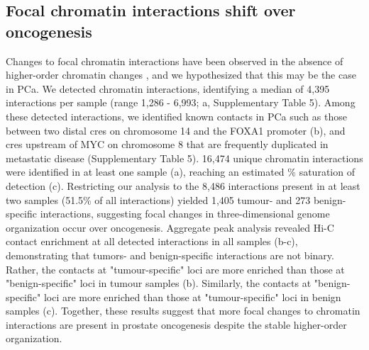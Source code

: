 \subsection{Focal chromatin interactions shift over oncogenesis}

Changes to focal chromatin interactions have been observed in the absence of higher-order chromatin changes \cite{takayamaTransitionQuiescentActivated2021,johnstoneLargeScaleTopologicalChanges2020}, and we hypothesized that this may be the case in PCa.
We detected chromatin interactions, identifying a median of 4,395 interactions per sample (range 1,286 - 6,993; a, Supplementary Table 5).
Among these detected interactions, we identified known contacts in PCa such as those between two distal \glspl{cre} on chromosome 14 and the FOXA1 promoter \cite{zhouNoncodingMutationsTarget2020} (b), and \glspl{cre} upstream of MYC on chromosome 8 that are frequently duplicated in metastatic disease \cite{quigleyGenomicHallmarksStructural2018} (Supplementary Table 5).
16,474 unique chromatin interactions were identified in at least one sample (a), reaching an estimated \% saturation of detection (c).
Restricting our analysis to the 8,486 interactions present in at least two samples (51.5\% of all interactions) yielded 1,405 tumour- and 273 benign-specific interactions, suggesting focal changes in three-dimensional genome organization occur over oncogenesis.
Aggregate peak analysis revealed Hi-C contact enrichment at all detected interactions in all samples (b-c), demonstrating that tumors- and benign-specific interactions are not binary.
Rather, the contacts at "tumour-specific" loci are more enriched than those at "benign-specific" loci in tumour samples (b).
Similarly, the contacts at "benign-specific" loci are more enriched than those at "tumour-specific" loci in benign samples (c).
Together, these results suggest that more focal changes to chromatin interactions are present in prostate oncogenesis despite the stable higher-order organization.



